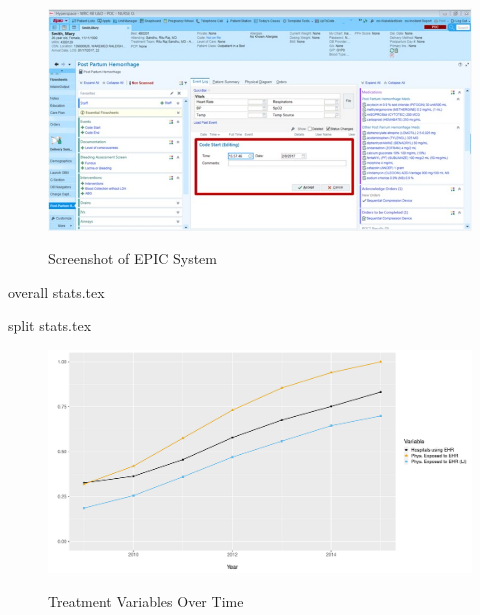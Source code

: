 \documentclass[11pt]{article}
\begin{document}
\begin{figure}[htp]
    \centering
    \caption{Screenshot of EPIC System}
    \includegraphics[scale=.5]{Objects/epic-ehr-screenshot.jpg}
    \label{fig:EPIC}
\end{figure}

{overall stats.tex}

{split stats.tex}

\begin{figure}[p]
\centering
    \caption{Treatment Variables Over Time}
    \includegraphics[scale=.55]{Objects/sum_stats_year.pdf}
    \label{fig:treatmentgraph}
\end{figure}
\end{document}
